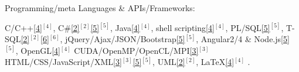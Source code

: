 \begin{cventries}

  \cventry
    {Programming/meta Languages \& APIs/Frameworks:} %
    {} %
    {} %
    {} %
    {     
      \begin{cvitems} %
        \item {
        C/C++\ref{4}{$^{[4]}$}, 
        C\#\ref{2}{$^{[2]}$}\ref{5}{$^{[5]}$}, 
        Java\ref{4}{$^{[4]}$}, 
        shell scripting\ref{4}{$^{[4]}$}, 
        PL/SQL\ref{5}{$^{[5]}$}, 
        T-SQL\ref{2}{$^{[2]}$}\ref{6}{$^{[6]}$},  
        jQuery/Ajax/JSON/Bootstrap\ref{5}{$^{[5]}$},  
        Angular2/4 \& Node.js\ref{5}{$^{[5]}$},  
        OpenGL\ref{4}{$^{[4]}$}       
        CUDA/OpenMP/OpenCL/MPI\ref{3}{$^{[3]}$}
        HTML/CSS/JavaScript/XML\ref{3}{$^{[3]}$}\ref{5}{$^{[5]}$}, 
        UML\ref{2}{$^{[2]}$},
        LaTeX\ref{4}{$^{[4]}$}%
		.}
	  \end{cvitems}
    }  
  \vspace{-0.4cm}


\end{cventries}
